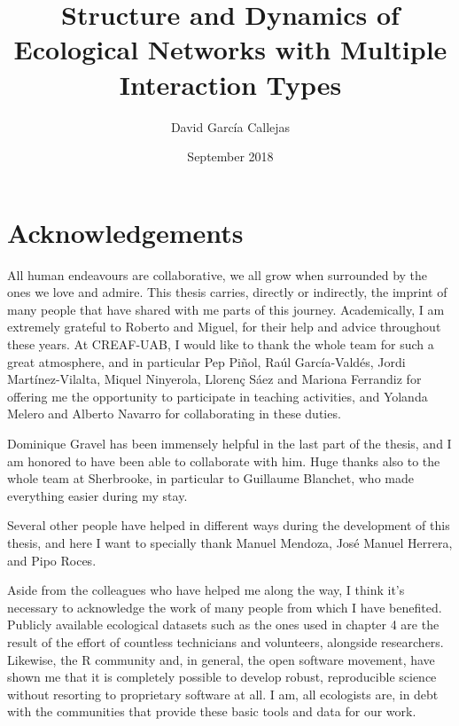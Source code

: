 \documentclass[10pt,a4paper,twoside,fleqn,showtrims]{memoir}
\title{Structure and Dynamics of Ecological Networks with Multiple Interaction Types} %
\author{David García Callejas} %
\date{September 2018} %
\begin{document}
\begin{titlingpage}
\maketitle %
\end{titlingpage}

\frontmatter %


\section*{Acknowledgements}

All human endeavours are collaborative, we all grow when surrounded by the ones we love and admire. This thesis carries, directly or indirectly, the imprint of many people that have shared with me parts of this journey. Academically, I am extremely grateful to Roberto and Miguel, for their help and advice throughout these years. At CREAF-UAB, I would like to thank the whole team for such a great atmosphere, and in particular Pep Piñol, Raúl García-Valdés, Jordi Martínez-Vilalta, Miquel Ninyerola, Llorenç Sáez and Mariona Ferrandiz for offering me the opportunity to participate in teaching activities, and Yolanda Melero and Alberto Navarro for collaborating in these duties.

Dominique Gravel has been immensely helpful in the last part of the thesis, and I am honored to have been able to collaborate with him. Huge thanks also to the whole team at Sherbrooke, in particular to Guillaume Blanchet, who made everything easier during my stay.

Several other people have helped in different ways during the development of this thesis, and here I want to specially thank Manuel Mendoza, José Manuel Herrera, and Pipo Roces.

Aside from the colleagues who have helped me along the way, I think it's necessary to acknowledge the work of many people from which I have benefited. Publicly available ecological datasets such as the ones used in chapter 4 are the result of the effort of countless technicians and volunteers, alongside researchers. Likewise, the R community and, in general, the open software movement, have shown me that it is completely possible to develop robust, reproducible science without resorting to proprietary software at all. I am, all ecologists are, in debt with the communities that provide these basic tools and data for our work.
\end{document}
